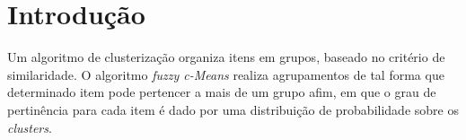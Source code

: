 \documentclass[12pt,a4paper]{article}
\newcommand{\farcm}{\mbox{\ensuremath{.\mkern-4mu^\prime}}}%
\newcommand{\farcs}{\mbox{\ensuremath{.\!\!^{\prime\prime}}}}
\newcommand{\ii }{\'{\i}}
\newcommand{\cc }{\c c}
\newcommand{\cca}{\c ca }
\newcommand{\ao}{\~ao }
\newcommand{\cao}{\c c\~ao }
\newcommand{\oes}{\~oes }
\newcommand{\coes}{\c c\~oes }
\newcommand{\eq}{\begin{equation}}
\newcommand{\feq}{\end{equation}}
\newcommand{\dm}{\begin{displaymath}}
\newcommand{\fdm}{\end{displaymath}}
\newcommand{\eqn}{\begin{eqnarray}}
\newcommand{\feqn}{\end{eqnarray}}
\newcommand{\grau}{^{\circ}}
\newcommand{\ba}{\arrowvert_{t_1}^{t_2}}
\newcommand{\bc}{\arrowvert_{0^{\circ} {\rm C}}^{t_2}}
\newcommand{\bb}{\arrowvert_{0^{\circ} {\rm C}}^{t_1}}
\newcommand{\Ms}{$\mathrm{M}_{\odot}$}
\newcommand{\reg}[1]{#1$^{\tiny{\circledR}}$}
\renewcommand{\baselinestretch}{1.5}
\providecommand{\sin}{} \renewcommand{\sin}{\hspace{2pt}\mathrm{sen}}
\numberwithin{equation}{section}
\begin{document}
%
%

\section{Introdução}
Um algoritmo  de clusterização organiza itens em grupos,  baseado no critério de similaridade. O algoritmo \textit{fuzzy c-Means} realiza agrupamentos de tal forma que determinado item pode pertencer a mais de um grupo afim, em que o grau de pertinência para cada item é dado por uma distribuição de probabilidade sobre os \textit{clusters}. 
\end{document}

